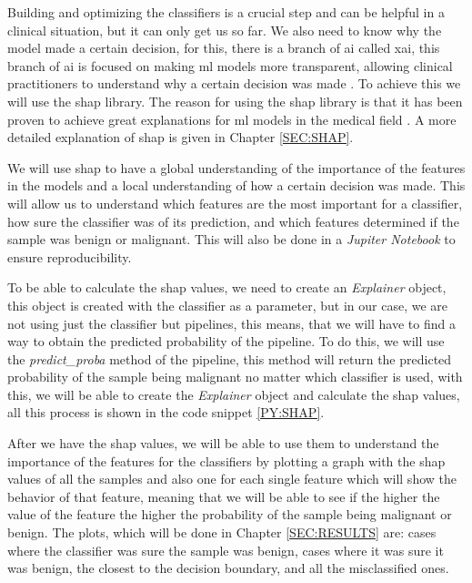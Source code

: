 Building and optimizing the classifiers is a crucial step and can be helpful in a clinical situation, but it can only get us so far. We also need to know why the model made a certain decision, for this, there is a branch of \ac{ai} called \acl{xai}, this branch of \ac{ai} is focused on making \ac{ml} models more transparent, allowing clinical practitioners to understand why a certain decision was made \cite{borys_explainable_2023}. To achieve this we will use the \acl{shap} library. The reason for using the \ac{shap} library \cite{lundberg_unified_2017} is that it has been proven to achieve great explanations for \ac{ml} models in the medical field \cite{massafra_analyzing_2023}. A 
more detailed
explanation of \ac{shap} is given in Chapter \ref{SEC:SHAP}.

We will use \ac{shap} to have a global understanding of the importance of the features in the models and a local understanding of how a certain decision was made. This will allow us to understand which features are the most important for a classifier, how sure the classifier was of its prediction, and which features determined if the sample was benign or malignant. This will also be done in a \textit{Jupiter Notebook} to ensure reproducibility.

To be able to calculate the \ac{shap} values, we need to create an \textit{Explainer} object, this object is created with the classifier as a parameter, but in our case, we are not using just the classifier but pipelines, this means, that we will have to find a way to obtain the predicted probability of the pipeline. To do this, we will use the \textit{predict\_proba} method of the pipeline, this method will return the predicted probability of the sample being malignant no matter which classifier is used, with this, we will be able to create the \textit{Explainer} object and calculate the \ac{shap} values, all this process is shown in the code snippet \ref{PY:SHAP}.


After we have the \ac{shap} values, we will be able to use them to understand the importance of the features for the classifiers by plotting a graph with the \ac{shap} values of all the samples and also one for each single feature which will show the behavior of that feature, meaning that we will be able to see if the higher the value of the feature the higher the probability of the sample being malignant or benign. The plots, which will be done in Chapter \ref{SEC:RESULTS} are: cases where the classifier was sure the sample was benign, cases where it was sure it was benign, the closest to the decision boundary, and all the misclassified ones.





